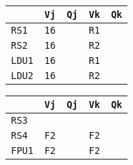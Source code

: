 \begin{enumerate}
    \begin{minipage}{0.45\textwidth}
        \centering
        \begin{tabular}{@{} l | l l l l @{}}
            \toprule
                & \texttt{Vj} & \texttt{Qj} & \texttt{Vk} & \texttt{Qk} \\
            \midrule
            \texttt{RS1} & \texttt{16} & & \texttt{R1} & \\ [.3em]
            \texttt{RS2} & \texttt{16} & & \texttt{R2} & \\
            \cmidrule{1-5}
            \texttt{LDU1} & \texttt{16} & & \texttt{R1} & \\ [.3em]
            \texttt{LDU2} & \texttt{16} & & \texttt{R2} & \\
            \bottomrule
        \end{tabular}
    \end{minipage}
    \hfill
    \begin{minipage}{0.45\textwidth}
        \centering
        \begin{tabular}{@{} l | l l l l @{}}
            \toprule
            & \texttt{Vj} & \texttt{Qj} & \texttt{Vk} & \texttt{Qk} \\
            \midrule
            \texttt{RS3} & & & & \\ [.3em]
            \texttt{RS4} & \texttt{F2} & & \texttt{F2} & \\
            \cmidrule{1-5}
            \texttt{FPU1} & \texttt{F2} & & \texttt{F2} & \\
            \bottomrule
        \end{tabular}
    \end{minipage}


\end{enumerate}
